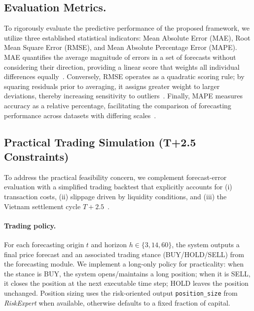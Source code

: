 \documentclass{ieeeaccess}
\begin{document}
\subsection{Evaluation Metrics.} 
To rigorously evaluate the predictive performance of the proposed framework, we utilize three established statistical indicators: Mean Absolute Error (MAE), Root Mean Square Error (RMSE), and Mean Absolute Percentage Error (MAPE). MAE quantifies the average magnitude of errors in a set of forecasts without considering their direction, providing a linear score that weights all individual differences equally~\cite{willmott2005advantages}. Conversely, RMSE operates as a quadratic scoring rule; by squaring residuals prior to averaging, it assigns greater weight to larger deviations, thereby increasing sensitivity to outliers~\cite{chai2014root}. Finally, MAPE measures accuracy as a relative percentage, facilitating the comparison of forecasting performance across datasets with differing scales~\cite{hyndman2006another}.

\subsection{Practical Trading Simulation (T+2.5 Constraints)}
To address the practical feasibility concern, we complement forecast-error evaluation with a simplified trading backtest that explicitly accounts for (i) transaction costs, (ii) slippage driven by liquidity conditions, and (iii) the Vietnam settlement cycle $T+2.5$~\cite{TinNhanhChungkhoan2025}.

\paragraph{Trading policy.}
For each forecasting origin $t$ and horizon $h \in \{3,14,60\}$, the system outputs a final price forecast and an associated trading stance (BUY/HOLD/SELL) from the forecasting module. We implement a long-only policy for practicality: when the stance is BUY, the system opens/maintains a long position; when it is SELL, it closes the position at the next executable time step; HOLD leaves the position unchanged. Position sizing uses the risk-oriented output \texttt{position\_size} from \textit{RiskExpert} when available, otherwise defaults to a fixed fraction of capital.
\end{document}

